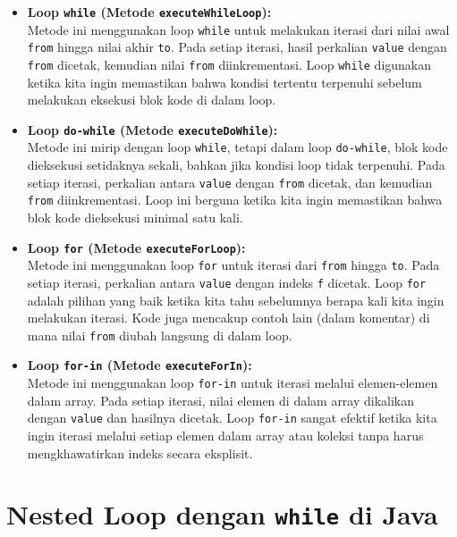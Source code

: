 \begin{itemize}
	\item \textbf{Loop \texttt{while} (Metode \texttt{executeWhileLoop}):} \\
	Metode ini menggunakan loop \texttt{while} untuk melakukan iterasi dari nilai awal \texttt{from} hingga nilai akhir \texttt{to}. Pada setiap iterasi, hasil perkalian \texttt{value} dengan \texttt{from} dicetak, kemudian nilai \texttt{from} diinkrementasi. Loop \texttt{while} digunakan ketika kita ingin memastikan bahwa kondisi tertentu terpenuhi sebelum melakukan eksekusi blok kode di dalam loop.
	
	\item \textbf{Loop \texttt{do-while} (Metode \texttt{executeDoWhile}):} \\
	Metode ini mirip dengan loop \texttt{while}, tetapi dalam loop \texttt{do-while}, blok kode dieksekusi setidaknya sekali, bahkan jika kondisi loop tidak terpenuhi. Pada setiap iterasi, perkalian antara \texttt{value} dengan \texttt{from} dicetak, dan kemudian \texttt{from} diinkrementasi. Loop ini berguna ketika kita ingin memastikan bahwa blok kode dieksekusi minimal satu kali.
	
	\item \textbf{Loop \texttt{for} (Metode \texttt{executeForLoop}):} \\
	Metode ini menggunakan loop \texttt{for} untuk iterasi dari \texttt{from} hingga \texttt{to}. Pada setiap iterasi, perkalian antara \texttt{value} dengan indeks \texttt{f} dicetak. Loop \texttt{for} adalah pilihan yang baik ketika kita tahu sebelumnya berapa kali kita ingin melakukan iterasi. Kode juga mencakup contoh lain (dalam komentar) di mana nilai \texttt{from} diubah langsung di dalam loop.
	
	\item \textbf{Loop \texttt{for-in} (Metode \texttt{executeForIn}):} \\
	Metode ini menggunakan loop \texttt{for-in} untuk iterasi melalui elemen-elemen dalam array. Pada setiap iterasi, nilai elemen di dalam array dikalikan dengan \texttt{value} dan hasilnya dicetak. Loop \texttt{for-in} sangat efektif ketika kita ingin iterasi melalui setiap elemen dalam array atau koleksi tanpa harus mengkhawatirkan indeks secara eksplisit.
\end{itemize}




\section{Nested Loop dengan \texttt{while} di Java}

